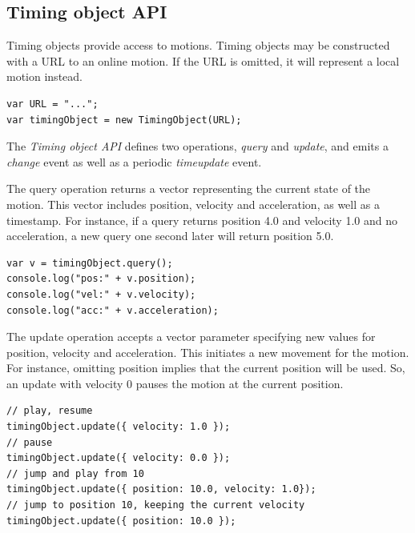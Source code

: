 \documentclass[graybox]{svmult}
\begin{document}
\subsection{Timing object API}
\label{sec:motionapi}

Timing objects provide access to motions. Timing objects may be constructed
with a URL to an online motion. If the URL is omitted, it will represent a
local motion instead.

\begin{lstlisting}[caption=Constructing a timing object.]
var URL = "...";
var timingObject = new TimingObject(URL);
\end{lstlisting}

The \emph{Timing object API} defines two operations, \emph{query} and
\emph{update}, and emits a \emph{change} event as well as a periodic
\emph{timeupdate} event.



The query operation returns a vector representing the current state of the
motion. This vector includes position, velocity and acceleration, as well as a
timestamp. For instance, if a query returns position 4.0 and velocity 1.0 and no acceleration, a
new query one second later will return position 5.0.

\begin{lstlisting}[caption=Querying the timing object to get a snapshot vector.]
var v = timingObject.query();
console.log("pos:" + v.position);
console.log("vel:" + v.velocity);
console.log("acc:" + v.acceleration);
\end{lstlisting}



The update operation accepts a vector parameter specifying new values for
position, velocity and acceleration. This initiates a new movement for the
motion. For instance, omitting position implies that the current position will be used.
So, an update with velocity 0 pauses the motion at the current position.

\begin{lstlisting}[caption=Updating the timing object.]
// play, resume
timingObject.update({ velocity: 1.0 }); 
// pause
timingObject.update({ velocity: 0.0 });
// jump and play from 10
timingObject.update({ position: 10.0, velocity: 1.0});
// jump to position 10, keeping the current velocity
timingObject.update({ position: 10.0 });
\end{lstlisting}


\end{document}

